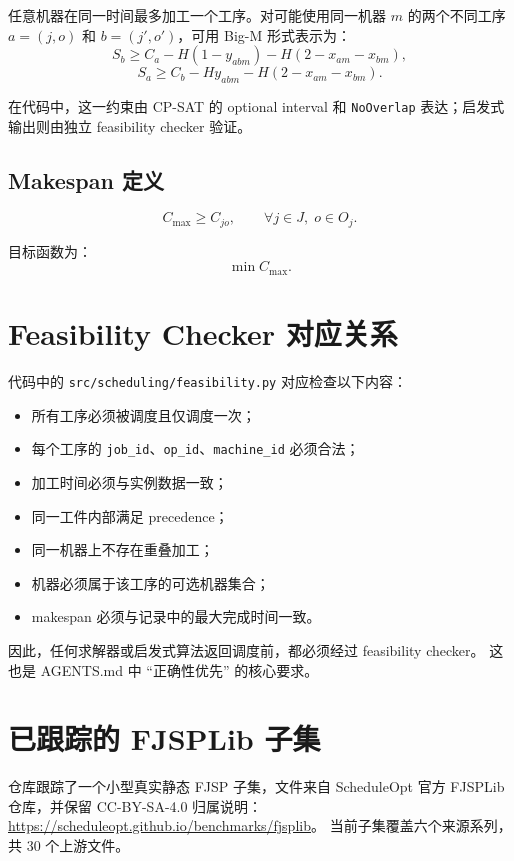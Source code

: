 ﻿\documentclass[11pt]{ctexart}
\begin{document}
任意机器在同一时间最多加工一个工序。对可能使用同一机器 $m$ 的两个不同工序
$a=(j,o)$ 和 $b=(j',o')$，可用 Big-M 形式表示为：
\[
S_b \ge C_a - H(1-y_{abm}) - H(2-x_{am}-x_{bm}),
\]
\[
S_a \ge C_b - Hy_{abm} - H(2-x_{am}-x_{bm}).
\]

在代码中，这一约束由 CP-SAT 的 optional interval 和 \texttt{NoOverlap}
表达；启发式输出则由独立 feasibility checker 验证。

\subsection{Makespan 定义}

\[
C_{\max} \ge C_{jo},
\qquad \forall j \in J,\; o \in O_j.
\]

目标函数为：
\[
\min C_{\max}.
\]

\section{Feasibility Checker 对应关系}

代码中的 \texttt{src/scheduling/feasibility.py} 对应检查以下内容：

\begin{itemize}
  \item 所有工序必须被调度且仅调度一次；
  \item 每个工序的 \texttt{job\_id}、\texttt{op\_id}、\texttt{machine\_id} 必须合法；
  \item 加工时间必须与实例数据一致；
  \item 同一工件内部满足 precedence；
  \item 同一机器上不存在重叠加工；
  \item 机器必须属于该工序的可选机器集合；
  \item makespan 必须与记录中的最大完成时间一致。
\end{itemize}

因此，任何求解器或启发式算法返回调度前，都必须经过 feasibility checker。
这也是 AGENTS.md 中 ``正确性优先'' 的核心要求。

\section{已跟踪的 FJSPLib 子集}

仓库跟踪了一个小型真实静态 FJSP 子集，文件来自 ScheduleOpt 官方 FJSPLib
仓库，并保留 CC-BY-SA-4.0 归属说明：
\url{https://scheduleopt.github.io/benchmarks/fjsplib}。
当前子集覆盖六个来源系列，共 30 个上游文件。
\end{document}
